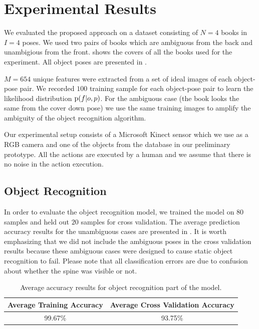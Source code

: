 \section{Experimental Results}



    We evaluated the proposed approach on a dataset consisting of $N = 4$ books in $I = 4$ poses. We used two pairs of books which are ambiguous from the back and unambigious from the front.  shows the covers of all the books used for the experiment. All object poses are presented in . 
    
$M = 654$ unique features were extracted from a set of ideal images of each object-pose pair. We recorded $100$ training sample for each object-pose pair to learn the likelihood distribution $\text{p}(f|o,p)$. For the ambiguous case (the book looks the same from the cover down pose) we use the same training images to amplify the ambiguity of the object recognition algorithm.

    Our experimental setup consists of a Microsoft Kinect sensor which we use as a RGB camera and one of the objects from the database in our preliminary prototype. All the actions are executed by a human and we assume that there is no noise in the action execution. 

    \subsection{Object Recognition}
    
	In order to evaluate the object recognition model, we trained the model on $80$ samples and held out $20$ samples for cross validation. The average prediction accuracy results for the unambiguous cases are presented in . It is worth emphasizing that we did not include the ambiguous poses in the cross validation results because these ambiguous cases were designed to cause static object recognition to fail. Please note that all classification errors are due to confusion about whether the spine was visible or not.    
    
 
        
        \begin{table}[h]
                \centering
                \begin{tabular}{|c|c|}
                \hline
                Average Training Accuracy & Average Cross Validation Accuracy \\
                \hline
                99.67\% & 93.75\% \\
                \hline
                \end{tabular}
                \caption{Average accuracy results for object recognition part of the model.}
                \label{tab:accuracy}
		\end{table}

